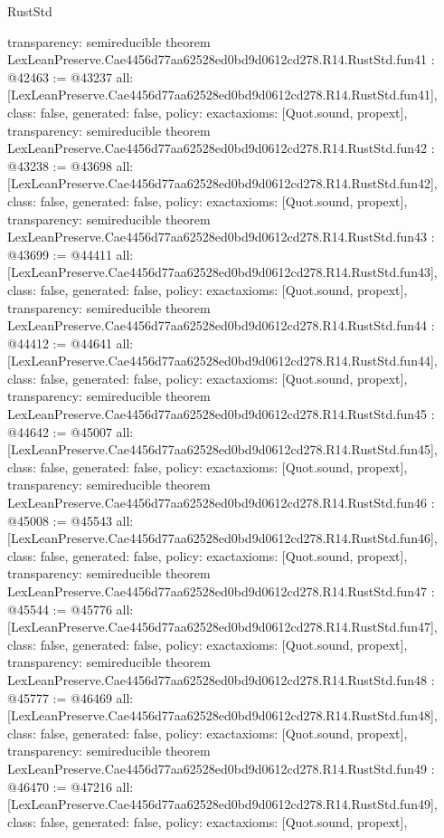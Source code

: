\begin{lexlean}{RustStd}
\begin{coremodule}
{  transparency: semireducible
}
theorem LexLeanPreserve.Cae4456d77aa62528ed0bd9d0612cd278.R14.RustStd.fun41 : @42463 := @43237 {
  all: [LexLeanPreserve.Cae4456d77aa62528ed0bd9d0612cd278.R14.RustStd.fun41],
  class: false,
  generated: false,
  policy: exact{axioms: [Quot.sound, propext]},
  transparency: semireducible
}
theorem LexLeanPreserve.Cae4456d77aa62528ed0bd9d0612cd278.R14.RustStd.fun42 : @43238 := @43698 {
  all: [LexLeanPreserve.Cae4456d77aa62528ed0bd9d0612cd278.R14.RustStd.fun42],
  class: false,
  generated: false,
  policy: exact{axioms: [Quot.sound, propext]},
  transparency: semireducible
}
theorem LexLeanPreserve.Cae4456d77aa62528ed0bd9d0612cd278.R14.RustStd.fun43 : @43699 := @44411 {
  all: [LexLeanPreserve.Cae4456d77aa62528ed0bd9d0612cd278.R14.RustStd.fun43],
  class: false,
  generated: false,
  policy: exact{axioms: [Quot.sound, propext]},
  transparency: semireducible
}
theorem LexLeanPreserve.Cae4456d77aa62528ed0bd9d0612cd278.R14.RustStd.fun44 : @44412 := @44641 {
  all: [LexLeanPreserve.Cae4456d77aa62528ed0bd9d0612cd278.R14.RustStd.fun44],
  class: false,
  generated: false,
  policy: exact{axioms: [Quot.sound, propext]},
  transparency: semireducible
}
theorem LexLeanPreserve.Cae4456d77aa62528ed0bd9d0612cd278.R14.RustStd.fun45 : @44642 := @45007 {
  all: [LexLeanPreserve.Cae4456d77aa62528ed0bd9d0612cd278.R14.RustStd.fun45],
  class: false,
  generated: false,
  policy: exact{axioms: [Quot.sound, propext]},
  transparency: semireducible
}
theorem LexLeanPreserve.Cae4456d77aa62528ed0bd9d0612cd278.R14.RustStd.fun46 : @45008 := @45543 {
  all: [LexLeanPreserve.Cae4456d77aa62528ed0bd9d0612cd278.R14.RustStd.fun46],
  class: false,
  generated: false,
  policy: exact{axioms: [Quot.sound, propext]},
  transparency: semireducible
}
theorem LexLeanPreserve.Cae4456d77aa62528ed0bd9d0612cd278.R14.RustStd.fun47 : @45544 := @45776 {
  all: [LexLeanPreserve.Cae4456d77aa62528ed0bd9d0612cd278.R14.RustStd.fun47],
  class: false,
  generated: false,
  policy: exact{axioms: [Quot.sound, propext]},
  transparency: semireducible
}
theorem LexLeanPreserve.Cae4456d77aa62528ed0bd9d0612cd278.R14.RustStd.fun48 : @45777 := @46469 {
  all: [LexLeanPreserve.Cae4456d77aa62528ed0bd9d0612cd278.R14.RustStd.fun48],
  class: false,
  generated: false,
  policy: exact{axioms: [Quot.sound, propext]},
  transparency: semireducible
}
theorem LexLeanPreserve.Cae4456d77aa62528ed0bd9d0612cd278.R14.RustStd.fun49 : @46470 := @47216 {
  all: [LexLeanPreserve.Cae4456d77aa62528ed0bd9d0612cd278.R14.RustStd.fun49],
  class: false,
  generated: false,
  policy: exact{axioms: [Quot.sound, propext]},
}
\end{coremodule}
\end{lexlean}
